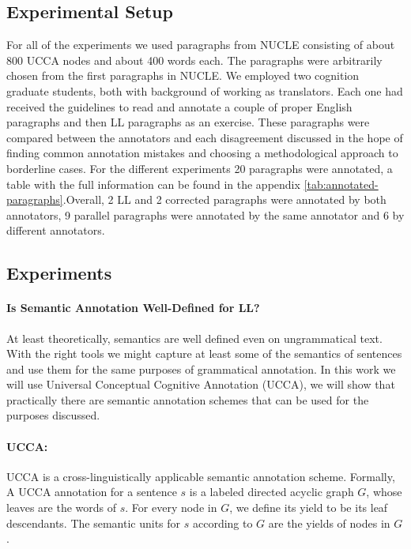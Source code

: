 \documentclass[letter,11pt]{article}
\begin{document}
\subsection{Experimental Setup}
 For all of the experiments we used paragraphs from NUCLE\cite{dahlmeier2013building} consisting of about 800 UCCA nodes and about 400 words each. The paragraphs were arbitrarily chosen from the first paragraphs in NUCLE.
 We employed two cognition graduate students, both
 with background of working as translators. Each
 one had received the guidelines to read and annotate a couple of
 proper English paragraphs and then LL paragraphs as
 an exercise. These paragraphs were compared between the annotators
 and each disagreement discussed in the hope of finding common annotation
 mistakes and choosing a methodological approach to borderline cases.
 For the different experiments 20 paragraphs were annotated, a table with the full information can be found in the appendix \ref{tab:annotated-paragraphs}.Overall, 2 LL and 2 corrected paragraphs were annotated by both annotators, 9 parallel paragraphs were annotated by the same annotator and 6 by different annotators.

\subsection{Experiments}

\paragraph{Is Semantic Annotation Well-Defined for LL?}

At least theoretically, semantics are well defined even on ungrammatical
text. With the right tools we might capture at least some of the semantics
of sentences and use them for the same purposes of grammatical annotation. In this work we will use Universal Conceptual Cognitive
Annotation (UCCA)\cite{abend2013universal}, we will show that practically
there are semantic annotation schemes that can be used for the purposes discussed.

\paragraph{UCCA:} UCCA  is a cross-linguistically applicable semantic annotation scheme. Formally, 
A UCCA annotation for a sentence $s$ is a labeled directed acyclic graph $G$, whose
leaves are the words of $s$. For every node in $G$,
we define its yield to be its leaf descendants. The
semantic units for $s$ according to $G$ are the yields
of nodes in $G$.
\end{document}
